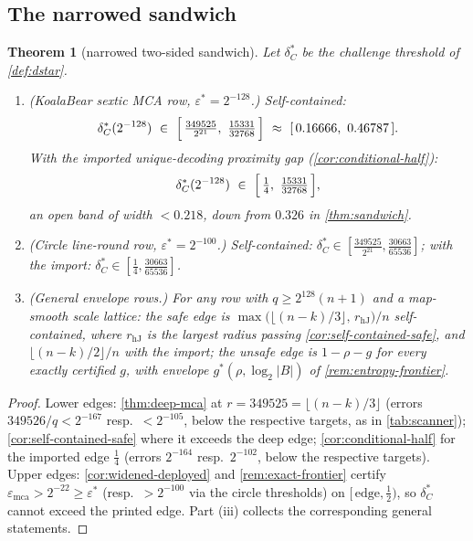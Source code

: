 \documentclass[11pt]{article}
\newtheorem{theorem}{Theorem}[section]
\theoremstyle{definition}
\theoremstyle{remark}
\newcommand{\B}{B}
\newcommand{\emca}{\varepsilon_{\mathrm{mca}}}
\begin{document}
\subsection{The narrowed sandwich}\label{sec:pincer-sandwich}

\begin{theorem}[narrowed two-sided sandwich]\label{thm:sandwich2}
Let $\delta^*_C$ be the challenge threshold of \cref{def:dstar}.
\begin{enumerate}[label=\textup{(\roman*)}]
\item \textup{(KoalaBear sextic MCA row, $\varepsilon^*=2^{-128}$.)} Self-contained:
\[
\delta^*_C(2^{-128})\ \in\ \Bigl[\,\tfrac{349525}{2^{21}},\ \tfrac{15331}{32768}\,\Bigr]\ \approx\ [\,0.16666,\ 0.46787\,] .
\]
With the imported unique-decoding proximity gap \textup{(\cref{cor:conditional-half})}:
\[
\delta^*_C(2^{-128})\ \in\ \Bigl[\,\tfrac14,\ \tfrac{15331}{32768}\,\Bigr],
\]
an open band of width $<0.218$, down from $0.326$ in \cref{thm:sandwich}.
\item \textup{(Circle line-round row, $\varepsilon^*=2^{-100}$.)} Self-contained: $\delta^*_C\in[\tfrac{349525}{2^{21}},\tfrac{30663}{65536}]$; with the import: $\delta^*_C\in[\tfrac14,\tfrac{30663}{65536}]$.
\item \textup{(General envelope rows.)} For any row with $q\ge2^{128}(n+1)$ and a map-smooth scale lattice: the safe edge is $\max\bigl(\lfloor(n-k)/3\rfloor,\,r_{\mathrm{hJ}}\bigr)/n$ self-contained, where $r_{\mathrm{hJ}}$ is the largest radius passing \cref{cor:self-contained-safe}, and $\lfloor(n-k)/2\rfloor/n$ with the import; the unsafe edge is $1-\rho-g$ for every exactly certified $g$, with envelope $g^*(\rho,\log_2|\B|)$ of \cref{rem:entropy-frontier}.
\end{enumerate}
\end{theorem}

\begin{proof}
Lower edges: \cref{thm:deep-mca} at $r=349525=\lfloor(n-k)/3\rfloor$ (errors $349526/q<2^{-167}$ resp.\ $<2^{-105}$, below the respective targets, as in \cref{tab:scanner}); \cref{cor:self-contained-safe} where it exceeds the deep edge; \cref{cor:conditional-half} for the imported edge $\tfrac14$ (errors $2^{-164}$ resp.\ $2^{-102}$, below the respective targets). Upper edges: \cref{cor:widened-deployed} and \cref{rem:exact-frontier} certify $\emca>2^{-22}\ge\varepsilon^*$ (resp.\ $>2^{-100}$ via the circle thresholds) on $[\,\text{edge},\tfrac12)$, so $\delta^*_C$ cannot exceed the printed edge. Part \textup{(iii)} collects the corresponding general statements.
\end{proof}
\end{document}

